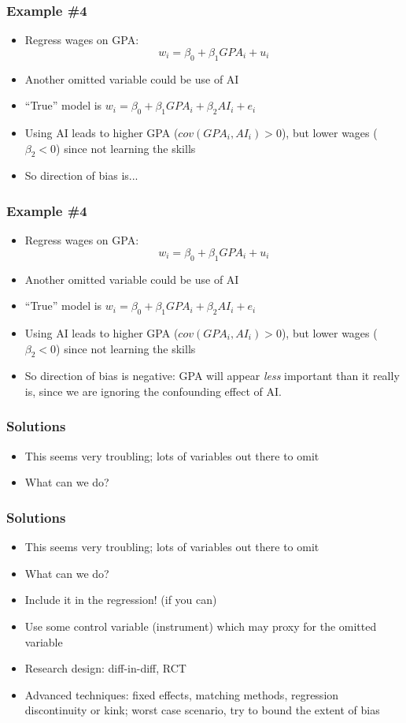 \documentclass[aspectratio=169]{beamer}
\begin{document}
\begin{frame}
    \frametitle{Example \#4}
    \begin{itemize}
        \item Regress wages on GPA:
        $$ 
            w_i = \beta_0 + \beta_1 GPA_i + u_i
        $$
        \item Another omitted variable could be use of AI
        \item ``True'' model is $w_i = \beta_0 + \beta_1 GPA_i + \beta_2 AI_i + e_i$
        \item Using AI leads to higher GPA ($cov(GPA_i, AI_i) > 0$), but lower wages ($\beta_2 < 0$) since not learning the skills
        \item So direction of bias is...
    \end{itemize}
\end{frame}

\begin{frame}
    \frametitle{Example \#4}
    \begin{itemize}
        \item Regress wages on GPA:
        $$ 
            w_i = \beta_0 + \beta_1 GPA_i + u_i
        $$
        \item Another omitted variable could be use of AI
        \item ``True'' model is $w_i = \beta_0 + \beta_1 GPA_i + \beta_2 AI_i + e_i$
        \item Using AI leads to higher GPA ($cov(GPA_i, AI_i) > 0$), but lower wages ($\beta_2 < 0$) since not learning the skills
        \item So direction of bias is negative: GPA will appear \textit{less} important than it really is, since we are ignoring the confounding effect of AI.
    \end{itemize}
\end{frame}

\begin{frame}
    \frametitle{Solutions}
    \begin{itemize}
        \item This seems very troubling; lots of variables out there to omit
        \item What can we do?
    \end{itemize}
\end{frame}

\begin{frame}
    \frametitle{Solutions}
    \begin{itemize}
        \item This seems very troubling; lots of variables out there to omit
        \item What can we do?
        \item Include it in the regression! (if you can)
        \item Use some control variable (instrument) which may proxy for the omitted variable
        \item Research design: diff-in-diff, RCT
        \item Advanced techniques: fixed effects, matching methods, regression discontinuity or kink; worst case scenario, try to bound the extent of bias
    \end{itemize}
\end{frame}
\end{document}
